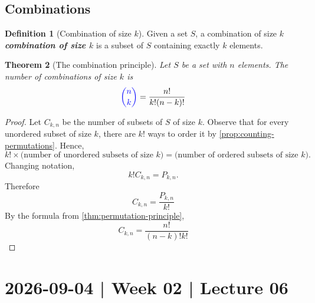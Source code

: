 \documentclass[10pt]{article}
\newtheorem{theorem}{Theorem}
\theoremstyle{definition}
\newtheorem{definition}[theorem]{Definition}
\newcommand{\1}[1]{\textbf{1}_{\left[#1\right]}} %
\DeclareRobustCommand{\demph}[1]{%
  \ifmmode
  {\color{Blue}#1}%
  \else
  {\color{Blue}\bfseries\slshape #1}%
  \fi
}
\begin{document}
\subsection{Combinations}
\begin{definition}[Combination of size $k$] 
  Given a set $S$, a \demph{combination of size $k$} is a subset of $S$
  containing exactly $k$ elements.
\end{definition}

\begin{theorem}[The combination principle]
  \label{thm:combination-principle}
  Let $S$ be a set with $n$ elements. The number of combinations of size $k$
  is
  \begin{equation*}
    \demph{{n\choose k}} =  \frac{n!}{k!(n-k)!}
  \end{equation*} 
\end{theorem}

\begin{proof}
  Let $C_{k,n}$ be the number of subsets of $S$ of size $k$. Observe that for
  every unordered subset of size $k$, there are $k!$ ways to order it by
  \cref{prop:counting-permutations}. Hence,
  \begin{equation*}
    k! \times \text{(number of unordered subsets of size $k$)}
    =
    \text{(number of ordered subsets of size $k$)}.
  \end{equation*}
  Changing notation,
  \begin{equation*}
    k! C_{k,n} = P_{k,n}.
  \end{equation*}
  Therefore
  \begin{equation*} 
    C_{k,n} = \frac{P_{k,n}}{k!}
  \end{equation*}
  By the formula from \cref{thm:permutation-principle},
  \begin{equation*}
    C_{k,n} = \frac{n!}{(n-k)!k!}
  \end{equation*}
\end{proof}

\newpage
\section{2026-09-04 | Week 02 | Lecture 06}
\end{document}
